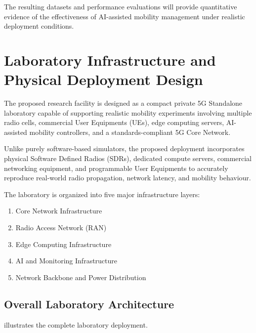 \documentclass[12pt,a4paper]{article}\usepackage[a4paper,margin=1in]{geometry}\usepackage{graphicx}\usepackage{longtable}\usepackage{booktabs}\usepackage{hyperref}\usepackage{enumitem}\usepackage{amsmath}\usepackage{tikz}\usepackage{pgfgantt}\usepackage{setspace}\setstretch{1.15}\usetikzlibrary{positioning,arrows.meta,shapes.geometric}
\begin{document}
	The resulting datasets and performance evaluations will provide quantitative evidence of the effectiveness of AI-assisted mobility management under realistic deployment conditions.
	
	\section{Laboratory Infrastructure and Physical Deployment Design}
	
	The proposed research facility is designed as a compact private 5G Standalone laboratory capable of supporting realistic mobility experiments involving multiple radio cells, commercial User Equipments (UEs), edge computing servers, AI-assisted mobility controllers, and a standards-compliant 5G Core Network.
	
	Unlike purely software-based simulators, the proposed deployment incorporates physical Software Defined Radios (SDRs), dedicated compute servers, commercial networking equipment, and programmable User Equipments to accurately reproduce real-world radio propagation, network latency, and mobility behaviour.
	
	The laboratory is organized into five major infrastructure layers:
	
	\begin{enumerate}
		
		\item Core Network Infrastructure
		
		\item Radio Access Network (RAN)
		
		\item Edge Computing Infrastructure
		
		\item AI and Monitoring Infrastructure
		
		\item Network Backbone and Power Distribution
		
	\end{enumerate}
	
	
	\subsection{Overall Laboratory Architecture}
	
	 illustrates the complete laboratory deployment.
	
\end{document}
